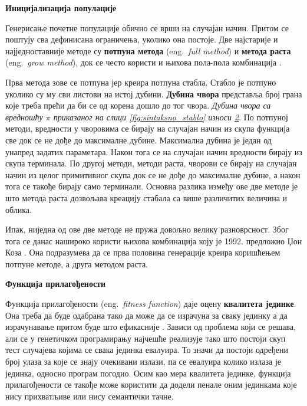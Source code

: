 \documentclass[a4paper]{article}
\begin{document}
\bigskip
\noindent
\textbf{\large Иницијализација популације}\newline

Генерисање почетне популације обично се врши на случајан начин. Притом се поштују сва дефинисана ограничења, уколико она постоје. Две најстарије и најједноставније методе су \textbf{потпуна метода} (eng.~{\em full method}) и \textbf{метода раста} (eng.~{\em grow method}), док се често користи и њихова пола-пола комбинација \cite{fieldGuidetoGP}. \newline

Прва метода зове се потпуна јер креира потпуна стабла. Стабло је потпуно уколико су му сви листови на истој дубини. \textbf{Дубина чвора} представља број грана које треба прећи да би се од корена дошло до тог чвора. \emph{Дубина чвора са вредношћу $\pi$ приказаног на слици \ref{fig:sintaksno_stablo} износи \underline{2}}. По потпуној методи, вредности у чворовима се бирају на случајан начин из скупа функција све док се не дође до максималне дубине. Максимална дубина је један од унапред задатих параметара. Након тога се на случајан начин вредности бирају из скупа терминала. По другој методи, методи раста, чворови се бирају на случајан начин из целог примитивног скупа док се не дође до максималне дубине, а након тога се такође бирају само терминали. Основна разлика између ове две методе је што метода раста дозвољава креацију стабала са више различитих величина и облика.\newline

Ипак, ниједна од ове две методе не пружа довољно велику разноврсност. Због тога се данас нашироко користи њихова комбинација коју је 1992. предложио Џон Коза \cite{koza}. Она подразумева да се прва половина генерације креира коришћењем потпуне методе, а друга методом раста.\newline

\bigskip
\noindent
\textbf{\large Функција прилагођености}\newline 
\label{fitness}

Функција прилагођености (eng.~{\em fitness function}) даје оцену \textbf{квалитета јединке}. Она треба да буде одабрана тако да може да се израчуна за сваку јединку а да израчунавање притом буде што ефикасније \cite{vi}. Зависи од проблема који се решава, али се у генетичком програмирању најчешће реализује тако што постоји скуп тест случајева којима се свака јединка евалуира. То значи да постоји одређени број улаза за које се знају очекивани излази, па се евалуира колико излаза је јединка, односно програм погодио.
Осим као мера квалитета јединке, функција прилагођености се такође може користити да додели пенале оним јединкама које нису прихватљиве или нису семантички тачне.\newline
\end{document}
